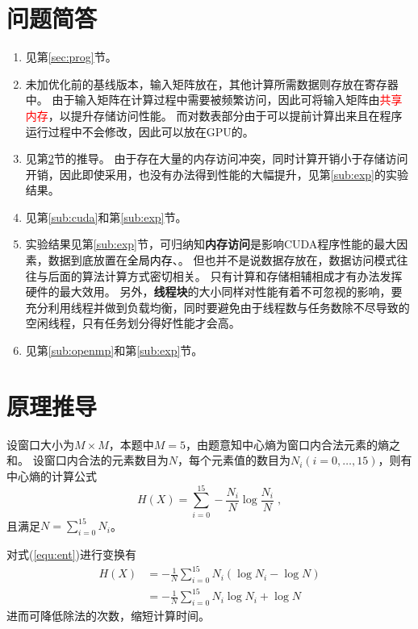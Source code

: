 \documentclass[logo,reportComp]{thesis}
\def\globalmem{\textcolor{black}{\kaiti 全局内存}}
\def\sharedmem{\textcolor{red}{\kaiti 共享内存}}
\def\constmem{\textcolor{blue}{\kaiti 常量内存}}
\begin{document}
\section{问题简答}
\begin{enumerate}
	\item 见第\ref{sec:prog}节。
	\item 未加优化前的基线版本，输入矩阵放在，其他计算所需数据则存放在寄存器中。
	由于输入矩阵在计算过程中需要被频繁访问，因此可将输入矩阵由\sharedmem，以提升存储访问性能。
	而对数表部分由于可以提前计算出来且在程序运行过程中不会修改，因此可以放在GPU的。
	\item 见第\ref{sec:theory}节的推导。
	由于存在大量的内存访问冲突，同时计算开销小于存储访问开销，因此即使采用，也没有办法得到性能的大幅提升，见第\ref{sub:exp}的实验结果。
	\item 见第\ref{sub:cuda}和第\ref{sub:exp}节。
	\item 实验结果见第\ref{sub:exp}节，可归纳知\textbf{内存访问}是影响CUDA程序性能的最大因素，数据到底放置在\globalmem、。
	但也并不是说数据存放在，数据访问模式往往与后面的算法计算方式密切相关。
	只有计算和存储相辅相成才有办法发挥硬件的最大效用。
	另外，\textbf{线程块}的大小同样对性能有着不可忽视的影响，要充分利用线程并做到负载均衡，同时要避免由于线程数与任务数除不尽导致的空闲线程，只有任务划分得好性能才会高。
	\item 见第\ref{sub:openmp}和第\ref{sub:exp}节。
\end{enumerate}

\section{原理推导}
\label{sec:theory}
设窗口大小为$M\times M$，本题中$M=5$，由题意知中心熵为窗口内合法元素的熵之和。
设窗口内合法的元素数目为$N$，每个元素值的数目为$N_i(i=0,\ldots,15)$，则有中心熵的计算公式
\begin{equation}
\label{equ:ent}
H(X)=\sum_{i=0}^{15}-\frac{N_i}{N}\log\frac{N_i}{N}\;,
\end{equation}
且满足$N=\sum_{i=0}^{15} N_i$。

对式(\ref{equ:ent})进行变换有
\begin{align}
H(X) &= -\frac{1}{N}\sum_{i=0}^{15}N_i(\log N_i-\log N)\\
&= -\frac{1}{N}\sum_{i=0}^{15}N_i\log N_i + \log N
\end{align}
进而可降低除法的次数，缩短计算时间。
\end{document}
